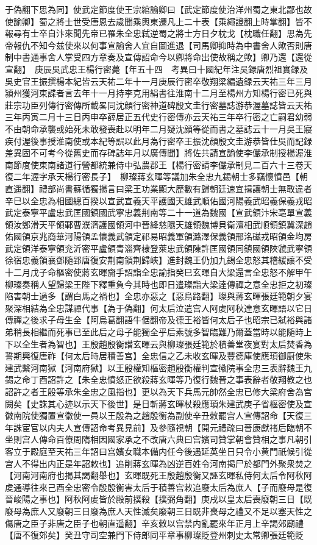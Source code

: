 于偽翻下思為同】使武定節度使王宗綰諭卿曰【武定節度使治洋州蜀之東北鄙也故使諭卿】蜀之將士世受唐恩去歲聞乘輿東遷凡上二十表【乘繩證翻上時掌翻】皆不報尋有士卒自汴來聞先帝已罹朱全忠弑逆蜀之將士方日夕枕戈【枕職任翻】思為先帝報仇不知今兹使來以何事宣諭舍人宜自圖進退【司馬卿抑時為中書舍人歟否則唐制中書通事舍人掌受四方章奏及宣傳詔命今以卿將命出使故稱之歟】卿乃還【還從宣翻】　庚辰吳武忠王楊行密薨【年五十四　考異曰十國紀年注吳録唐烈祖實録及吳史官王振撰楊本紀皆云天祐二年十一月庚辰行密卒敬翔梁編遺録云天祐三年三月潁州獲河東諜者言去年十一月持李克用絹書往淮南十二月至楊州方知楊行密已死與莊宗功臣列傳行密傳所載畧同沈顔行密神道碑殷文圭行密墓誌游恭渥墓誌皆云天祐三年丙寅二月十三日丙申卒薛居正五代史行密傳亦云天祐三年卒行密之亡嗣君幼弱不由朝命承襲或始死未敢發喪赴以明年二月疑沈顔等從而書之墓誌云十一月吳王寢疾付渥後事授淮南使或本紀等誤以此月為行密卒王振沈顔殷文圭游恭皆仕吳而記録差異固不可考今從舊史而存碑誌年月以廣傳聞】將佐共請宣諭使李儼承制授楊渥淮南節度使東南諸道行營都統兼侍中弘農郡王【楊行密請李儼承制見二百六十三卷天復二年渥字承天楊行密長子】　柳璨蔣玄暉等議加朱全忠九錫朝士多竊懷憤邑【朝直遥翻】禮部尚書蘇循獨揚言曰梁王功業顯大歷數有歸朝廷速宜揖讓朝士無敢違者辛巳以全忠為相國總百揆以宣武宣義天平護國天雄武順佑國河陽義武昭義保義戎昭武定泰寧平盧忠武匡國鎮國武寧忠義荆南等二十一道為魏國【宣武領汴宋亳單宣義領汝鄭滑天平領鄆曹濮濟護國領河中晉絳慈隰天雄領魏博貝衛澶相武順領鎮冀深趙佑國領京兆商華河陽領孟懷義武領定祁易昭義軍領潞澤保義領邢洺磁戎昭領金均房武定領洋泰寧領兖沂密平盧領青淄齊棣登萊忠武領陳許匡國領同鎮國領陜虢武寧領徐宿忠義領襄鄧隨郢唐復安荆南領荆歸峽】進封魏王仍加九錫全忠怒其稽緩讓不受十二月戊子命樞密使蔣玄暉齎手詔詣全忠諭指癸巳玄暉自大梁還言全忠怒不解甲午柳璨奏稱人望歸梁王陛下釋重負今其時也即日遣璨詣大梁逹傳禪之意全忠拒之初璨陷害朝士過多【謂白馬之禍也】全忠亦惡之【惡烏路翻】璨與蔣玄暉張廷範朝夕宴聚深相結為全忠謀禪代事【為于偽翻】何太后泣遣宫人阿䖍阿秋達意玄暉語以它日傳禪之後求子母生全【阿烏葛翻語牛倨翻帝及德王裕皆何太后子也昭宗已弑裕與諸弟稍長相繼而死事已至此后之母子能獨全乎后素號多智臨難乃爾蓋當時以能隨時上下以全生者為智也】王殷趙殷衡譛玄暉云與柳璨張廷範於積善堂夜宴對太后焚香為誓期興復唐祚【何太后時居積善宫】全忠信之乙未收玄暉及豐德庫使應頊御㕑使朱建武繫河南獄【河南府獄】以王殷權知樞密趙殷衡權判宣徽院事全忠三表辭魏王九錫之命丁酉詔許之【朱全忠憤怒正欲殺蔣玄暉等乃復行魏晉之事表辭者敬翔教之也詔許之者王殷等承朱全忠之風指也】更以為天下兵馬元帥然全忠已修大梁府舍為宫闕矣【史誅其心迹以示天下後世】是日斬蔣玄暉杖殺應頊朱建武庚子省樞密使及宣徽南院使獨置宣徽使一員以王殷為之趙殷衡為副使辛丑敕罷宫人宣傳詔命【天復三年誅宦官以内夫人宣傳詔命考異見前】及參隨視朝【開元禮疏曰晉康獻禇后臨朝不坐則宫人傳命百僚周隋相因國家承之不改唐六典曰宫嬪司贊掌朝會贊相之事凡朝引客立于殿庭至天祐三年詔曰宫嬪女職本備内任今後遇延英坐日只令小黄門祇候引從宫人不得出内正是年詔敕也】追削蔣玄暉為凶逆百姓令河南掲尸於都門外聚衆焚之【河南河南府也揭其謁翻舉也】玄暉既死王殷趙殷衡又誣玄暉私侍何太后令阿秋阿䖍通導往來己酉全忠密令殷殷衡害太后于積善宫敕追廢太后為庶人【子而廢母是復晉峻陽之事也】阿秋阿䖍皆於殿前撲殺【撲弼角翻】庚戌以皇太后喪廢朝三日【既廢母為庶人又廢朝三日廢為庶人天性滅矣廢朝三日既非喪母之禮又不足以塞天性之傷唐之臣子非唐之臣子也朝直遥翻】辛亥敕以宫禁内亂罷來年正月上辛謁郊廟禮【唐不復郊矣】癸丑守司空兼門下侍郎同平章事柳璨貶登州刺史太常卿張廷範貶